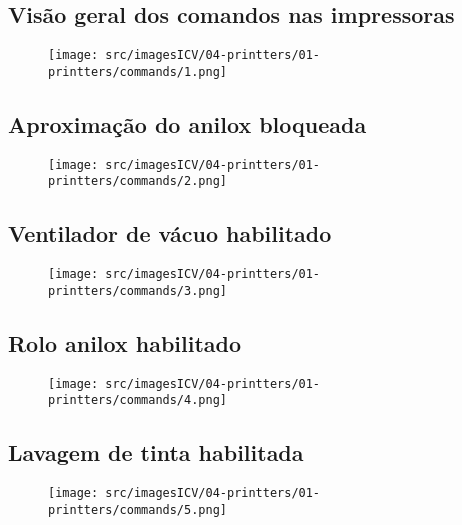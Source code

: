 \usepackage{graphicx}
\newpage
\thispagestyle{fancy}
\vspace{\fill}

\subsection{Visão geral dos comandos nas impressoras}
\begin{figure}
    \centering
    \texttt{[image: src/imagesICV/04-printters/01-printters/commands/1.png]}
\end{figure}
\newpage
\thispagestyle{fancy}
\vspace{\fill}

\subsection{Aproximação do anilox bloqueada}
\begin{figure}
    \centering
    \texttt{[image: src/imagesICV/04-printters/01-printters/commands/2.png]}
\end{figure}
\newpage
\thispagestyle{fancy}
\vspace{\fill}

\subsection{Ventilador de vácuo habilitado}
\begin{figure}
    \centering
    \texttt{[image: src/imagesICV/04-printters/01-printters/commands/3.png]}
\end{figure}
\newpage
\thispagestyle{fancy}
\vspace{\fill}

\subsection{Rolo anilox habilitado}
\begin{figure}
    \centering
    \texttt{[image: src/imagesICV/04-printters/01-printters/commands/4.png]}
\end{figure}
\newpage
\thispagestyle{fancy}
\vspace{\fill}

\subsection{Lavagem de tinta habilitada}
\begin{figure}
    \centering
    \texttt{[image: src/imagesICV/04-printters/01-printters/commands/5.png]}
\end{figure}
\newpage
\thispagestyle{fancy}
\vspace{\fill}

